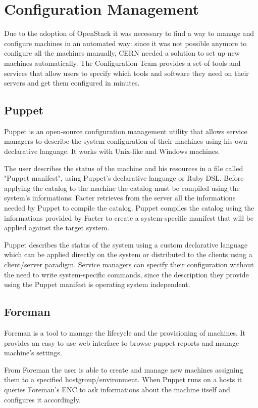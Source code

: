\section{Configuration Management}

Due to the adoption of OpenStack it was necessary to find a way to manage
and configure machines in an automated way: since it was not possible
anymore to configure all the machines manually, CERN needed a solution to
set up new machines automatically. The Configuration Team provides a set
of tools and services that allow users to specify which tools and software
they need on their servers and get them configured in minutes.

\subsection{Puppet}

Puppet is an open-source configuration management utility that allows
service managers to describe the system configuration of their machines
using his own declarative language. It works with Unix-like and Windows
machines.

The user describes the status of the machine and his resources in a file
called "Puppet manifest", using Puppet's declarative language or Ruby DSL.
Before applying the catalog to the machine the catalog must be compiled
using the system's informations: Facter retrieves from the server all the
informations needed by Puppet to compile the catalog. Puppet compiles the
catalog using the informations provided by Facter to create
a system-specific manifest that will be applied against the target system.

Puppet describes the status of the system using a custom declarative
language which can be applied directly on the system or distributed to the
clients using a client/server paradigm. Service managers can specify their
configuration without the need to write system-specific commands, since
the description they provide using the Puppet manifest is operating system
independent.

\subsection{Foreman}

Foreman is a tool to manage the lifecycle and the provisioning of
machines. It provides an easy to use web interface to browse puppet
reports and manage machine's settings.

From Foreman the user is able to create and manage new machines assigning
them to a specified hostgroup/environment. When Puppet runs on a hosts it
queries Foreman's ENC to ask informations about the machine itself and
configures it accordingly.

